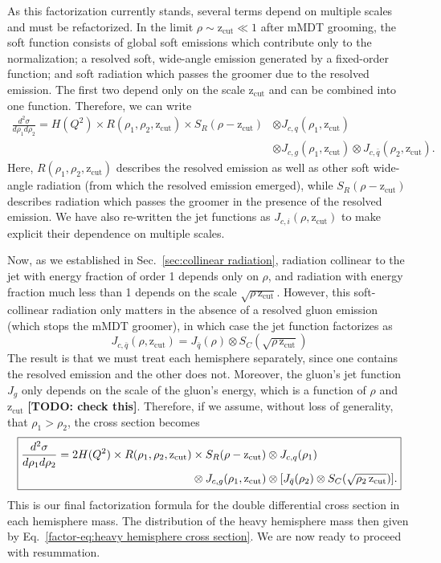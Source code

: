 \documentclass[../thesis.tex]{subfiles}
\providecommand{\zcut}{\mathrm{z_{cut}}}
\begin{document}
	As this factorization currently stands, several terms depend on multiple scales and must be refactorized. In the limit $\rho \sim \zcut \ll 1$ after mMDT grooming, the soft function consists of global soft emissions which contribute only to the normalization; a resolved soft, wide-angle emission generated by a fixed-order function; and soft radiation which passes the groomer due to the resolved emission. The first two depend only on the scale $\zcut$ and can be combined into one function. Therefore, we can write
	\begin{equation}
	\begin{aligned}
		\frac{d^2\sigma}{d\rho_1 d\rho_2} = H(Q^2) \times R(\rho_1, \rho_2, \zcut) \times S_R(\rho - \zcut) &\otimes J_{c, q}(\rho_1, \zcut)\\
			& \otimes J_{c, g}(\rho_1, \zcut) \otimes J_{c, \bar q}(\rho_2, \zcut).
	\end{aligned}
	\end{equation}
	Here, $R(\rho_1, \rho_2, \zcut)$ describes the resolved emission as well as other soft wide-angle radiation (from which the resolved emission emerged), while $S_R(\rho - \zcut)$ describes radiation which passes the groomer in the presence of the resolved emission. We have also re-written the jet functions as $J_{c, i}(\rho, \zcut)$ to make explicit their dependence on multiple scales.

	Now, as we established in Sec.~\ref{sec:collinear radiation}, radiation collinear to the jet with energy fraction of order 1 depends only on $\rho$, and radiation with energy fraction much less than 1 depends on the scale $\sqrt{\rho\,\zcut}$. However, this soft-collinear radiation only matters in the absence of a resolved gluon emission (which stops the mMDT groomer), in which case the jet function factorizes as
	\begin{equation}
		J_{c, \bar q}(\rho, \zcut) = J_{\bar q}(\rho) \otimes S_C(\sqrt{\rho\,\zcut})
	\end{equation}
	The result is that we must treat each hemisphere separately, since one contains the resolved emission and the other does not. Moreover, the gluon's jet function $J_g$ only depends on the scale of the gluon's energy, which is a function of $\rho$ and $\zcut$ {\color{red}\textbf{[TODO: check this]}}. Therefore, if we assume, without loss of generality, that $\rho_1 > \rho_2$, the cross section becomes
	\begin{equation}\label{factor-eq:factorization formula}
	\boxed{
	\begin{aligned}
		\frac{d^2\sigma}{d\rho_1 d\rho_2} = 2 H(Q^2) \times R(\rho_1, \rho_2, \zcut) &\times S_R(\rho - \zcut) \otimes J_{c, q}(\rho_1)\\
			& \otimes J_{c, g}(\rho_1, \zcut) \otimes \qty[J_{\bar q}(\rho_2) \otimes S_C(\sqrt{\rho_2\,\zcut})].
	\end{aligned}
	}
	\end{equation}
	This is our final factorization formula for the double differential cross section in each hemisphere mass. The distribution of the heavy hemisphere mass then given by Eq.~\ref{factor-eq:heavy hemisphere cross section}. We are now ready to proceed with resummation.

%  
% 
\end{document}

